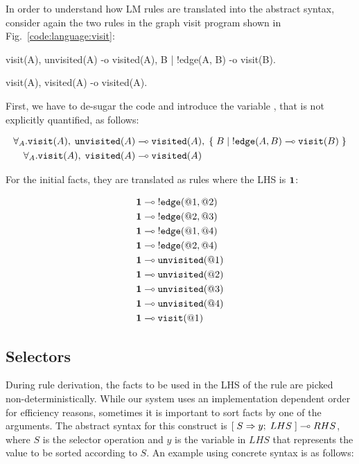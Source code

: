 In order to understand how LM rules are translated into the abstract syntax,
consider again the two rules in the graph visit program shown in
Fig.~\ref{code:language:visit}:

\nopagebreak

\begin{Code}
visit(A),
unvisited(A)
   -o visited(A),
      {B | !edge(A, B) -o visit(B)}.

visit(A),
visited(A)
   -o visited(A).
\end{Code}

First, we have to de-sugar the code and introduce the variable , that is
not explicitly quantified, as follows:

\nopagebreak

\begin{align}
\forall_A. \mathtt{visit}(A), \; \mathtt{unvisited}(A) \multimap & \;
\mathtt{visited}(A), \; \{ \; B \; | \; {!}\mathtt{edge}(A, B) \multimap \mathtt{visit}(B) \; \}\\
\forall_A. \mathtt{visit}(A), \; \mathtt{visited}(A) \multimap & \;
\mathtt{visited}(A)
\end{align}

For the initial facts, they are translated as rules where the LHS is $\mathbf{1}$:

\nopagebreak

\begin{align}
\mathbf{1} \multimap \; & {!} \mathtt{edge}(@1, @2) \\
\mathbf{1} \multimap \; & {!} \mathtt{edge}(@2, @3) \\
\mathbf{1} \multimap \; & {!} \mathtt{edge}(@1, @4) \\
\mathbf{1} \multimap \; & {!} \mathtt{edge}(@2, @4) \\
\mathbf{1} \multimap \; & \mathtt{unvisited}(@1)  \\
\mathbf{1} \multimap \; & \mathtt{unvisited}(@2) \\
\mathbf{1} \multimap \; & \mathtt{unvisited}(@3) \\
\mathbf{1} \multimap \; & \mathtt{unvisited}(@4) \\
\mathbf{1} \multimap \; & \mathtt{visit}(@1)
\end{align}

\subsection{Selectors}\label{section:language:selector}

During rule derivation, the facts to be used in the LHS of the rule are picked
non-deterministically. While our system uses an implementation dependent order
for efficiency reasons, sometimes it is important to sort facts by one of the
arguments. The abstract syntax for this construct is
$[\; S \Rightarrow y; \; LHS \;] \multimap RHS$, where $S$ is the selector operation and $y$ is the
variable in $LHS$ that represents the value to be sorted according to $S$. An
example using concrete syntax is as follows:

